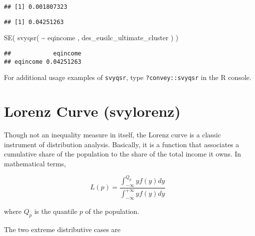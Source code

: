\documentclass[
]{book}
\newenvironment{Shaded}{\begin{snugshade}}{\end{snugshade}}
\newcommand{\CommentTok}[1]{\textcolor[rgb]{0.56,0.35,0.01}{\textit{#1}}}
\newcommand{\FunctionTok}[1]{\textcolor[rgb]{0.00,0.00,0.00}{#1}}
\newcommand{\NormalTok}[1]{#1}
\newcommand{\SpecialCharTok}[1]{\textcolor[rgb]{0.00,0.00,0.00}{#1}}
\begin{document}
\begin{verbatim}
## [1] 0.001807323
\end{verbatim}

\begin{Shaded}
\end{Shaded}

\begin{verbatim}
## [1] 0.04251263
\end{verbatim}

\begin{Shaded}
\begin{Highlighting}[]
\FunctionTok{SE}\NormalTok{( }\FunctionTok{svyqsr}\NormalTok{( }\SpecialCharTok{\textasciitilde{}}\NormalTok{ eqincome , des\_eusilc\_ultimate\_cluster ) )}
\end{Highlighting}
\end{Shaded}

\begin{verbatim}
##            eqincome
## eqincome 0.04251263
\end{verbatim}

For additional usage examples of \texttt{svyqsr}, type \texttt{?convey::svyqsr} in the R console.

\hypertarget{lorenz-curve-svylorenz}{%
\section{Lorenz Curve (svylorenz)}\label{lorenz-curve-svylorenz}}

Though not an inequality measure in itself, the Lorenz curve is a classic instrument of distribution analysis. Basically, it is a function that associates a cumulative share of the population to the share of the total income it owns. In mathematical terms,

\[
L(p) = \frac{\int_{-\infty}^{Q_p}yf(y)dy}{\int_{-\infty}^{+\infty}yf(y)dy}
\]

where \(Q_p\) is the quantile \(p\) of the population.

The two extreme distributive cases are
\end{document}
